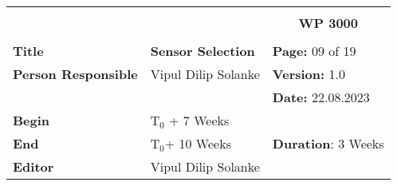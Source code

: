\begin{table}[!h]
  \begin{center}
    \begin{tabular}{|p{35mm}||p{55mm}|p{50mm}||p{40mm}|}
      \hline
      \multicolumn{3}{|l||}{\textbf{}} & \multicolumn{1}{c|}{}                                                                                                                                                \\
      \multicolumn{3}{|l||}{\textbf{}} & \multicolumn{1}{c|}{\textbf{WP 3000}}                                                                                                                                \\
      \multicolumn{3}{|l||}{\textbf{}} & \multicolumn{1}{c|}{}                                                                                                                                                \\
      \hline\hline
      \textbf{Title}                   & \multicolumn{2}{p{7cm}||}{\textbf{Sensor Selection}}
                                       & \textbf{Page:} 09 of 19                                                                                                                                             \\
      \hline
      \textbf{Person Responsible}        & \multicolumn{2}{l||}{Vipul Dilip Solanke}                                                                                                   & \textbf{Version:} 1.0   \\
      \hline
      \multicolumn{3}{|l||}{}          & \textbf{Date:} 22.08.2023                                                                                                                                          \\
      \hline\hline
      \textbf{Begin}                  & \multicolumn{2}{l||}{T$_0$ + 7 Weeks}                                                                                                                &                         \\
      \hline
      \textbf{End}                    & \multicolumn{2}{l||}{T$_0$+ 10 Weeks}                                                                                                        & \textbf{Duration}: 3 Weeks \\
      \hline\hline
      \textbf{Editor}              & \multicolumn{3}{l|}{Vipul Dilip Solanke}                                                                                                                              \\

\end{tabular}
\end{center}
\end{table}
